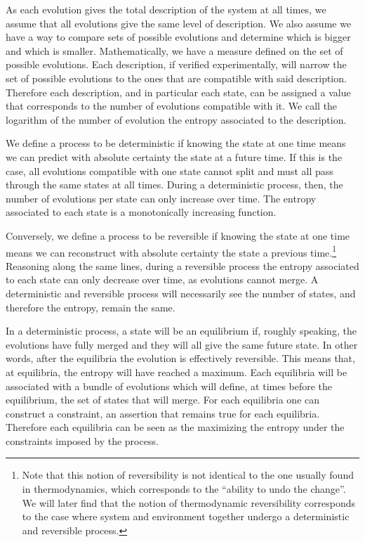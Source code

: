 \documentclass[letterpaper]{article}
\begin{document}
As each evolution gives the total description of the system at all times, we assume that all evolutions give the same level of description. We also assume we have a way to compare sets of possible evolutions and determine which is bigger and which is smaller. Mathematically, we have a measure defined on the set of possible evolutions. Each description, if verified experimentally, will narrow the set of possible evolutions to the ones that are compatible with said description. Therefore each description, and in particular each state, can be assigned a value that corresponds to the number of evolutions compatible with it. We call the logarithm of the number of evolution the entropy associated to the description.

We define a process to be deterministic if knowing the state at one time means we can predict with absolute certainty the state at a future time. If this is the case, all evolutions compatible with one state cannot split and must all pass through the same states at all times. During a deterministic process, then, the number of evolutions per state can only increase over time. The entropy associated to each state is a monotonically increasing function.

Conversely, we define a process to be reversible if knowing the state at one time means we can reconstruct with absolute certainty the state a previous time.\footnote{Note that this notion of reversibility is not identical to the one usually found in thermodynamics, which corresponds to the ``ability to undo the change''. We will later find that the notion of thermodynamic reversibility corresponds to the case where system and environment together undergo a deterministic and reversible process.} Reasoning along the same lines, during a reversible process the entropy associated to each state can only decrease over time, as evolutions cannot merge. A deterministic and reversible process will necessarily see the number of states, and therefore the entropy, remain the same.

In a deterministic process, a state will be an equilibrium if, roughly speaking, the evolutions have fully merged and they will all give the same future state. In other words, after the equilibria the evolution is effectively reversible. This means that, at equilibria, the entropy will have reached a maximum. Each equilibria will be associated with a bundle of evolutions which will define, at times before the equilibrium, the set of states that will merge. For each equilibria one can construct a constraint, an assertion that remains true for each equilibria. Therefore each equilibria can be seen as the maximizing the entropy under the constraints imposed by the process.
\end{document}
